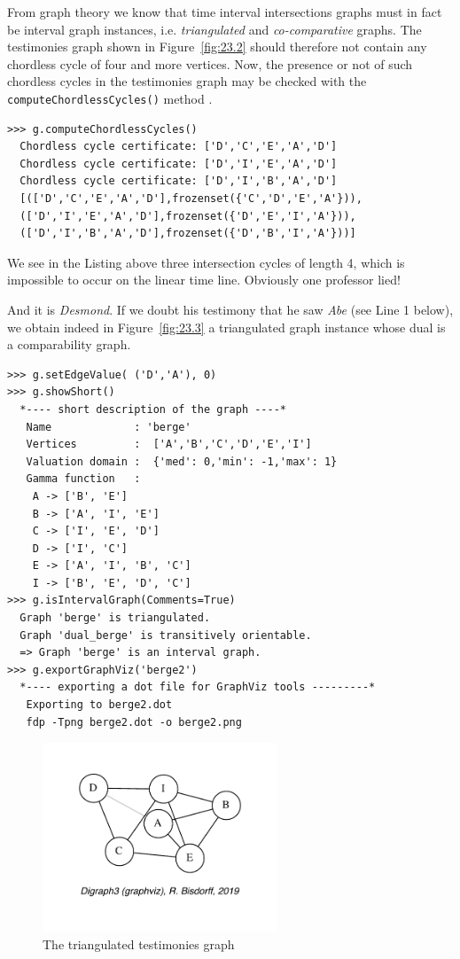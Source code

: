 From graph theory we know that time interval intersections graphs must in fact be interval graph instances, i.e. \emph{triangulated} and \emph{co-comparative} graphs. The testimonies graph shown in Figure~\vref{fig:23.2} should therefore not contain any chordless cycle of four and more vertices. Now, the presence or not of such chordless cycles in the testimonies graph may be checked with the \texttt{computeChordlessCycles()} method \citep{BIS-2010}.
\begin{lstlisting}
>>> g.computeChordlessCycles()
  Chordless cycle certificate: ['D','C','E','A','D']
  Chordless cycle certificate: ['D','I','E','A','D']
  Chordless cycle certificate: ['D','I','B','A','D']
  [(['D','C','E','A','D'],frozenset({'C','D','E','A'})),
  (['D','I','E','A','D'],frozenset({'D','E','I','A'})),
  (['D','I','B','A','D'],frozenset({'D','B','I','A'}))]
\end{lstlisting}
We see in the Listing above three intersection cycles of length 4, which is impossible to occur on the linear time line. Obviously one professor lied!

And it is \emph{Desmond}. If we doubt his testimony that he saw \emph{Abe} (see Line 1 below), we obtain indeed in Figure~\vref{fig:23.3} a triangulated graph instance whose dual is a comparability graph.
\begin{lstlisting}
>>> g.setEdgeValue( ('D','A'), 0)
>>> g.showShort()
  *---- short description of the graph ----*
   Name             : 'berge'
   Vertices         :  ['A','B','C','D','E','I']
   Valuation domain :  {'med': 0,'min': -1,'max': 1}
   Gamma function   : 
    A -> ['B', 'E']
    B -> ['A', 'I', 'E']
    C -> ['I', 'E', 'D']
    D -> ['I', 'C']
    E -> ['A', 'I', 'B', 'C']
    I -> ['B', 'E', 'D', 'C']
>>> g.isIntervalGraph(Comments=True)
  Graph 'berge' is triangulated.
  Graph 'dual_berge' is transitively orientable.
  => Graph 'berge' is an interval graph.
>>> g.exportGraphViz('berge2')
  *---- exporting a dot file for GraphViz tools ---------*
   Exporting to berge2.dot
   fdp -Tpng berge2.dot -o berge2.png
\end{lstlisting}
\begin{figure}[ht]
\sidecaption[t]
\includegraphics[width=7cm]{Figures/23-3-berge2.pdf}
\caption{The triangulated testimonies graph} 
\label{fig:23.3}       %
\end{figure}

